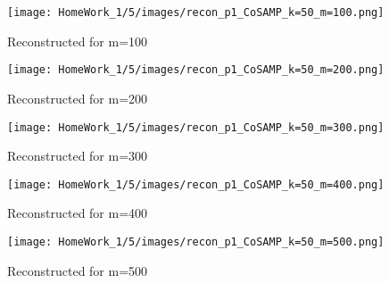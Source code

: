 \documentclass{article}
\begin{document}
\begin{figure}[h!]
    \centering
    \begin{minipage}{0.1\textwidth}
        \texttt{[image: HomeWork\_1/5/images/recon\_p1\_CoSAMP\_k=50\_m=100.png]}
        \caption{Reconstructed for m=100}
    \end{minipage}
    \hspace{0.5cm}
    \begin{minipage}{0.1\textwidth}
        \centering
        \texttt{[image: HomeWork\_1/5/images/recon\_p1\_CoSAMP\_k=50\_m=200.png]}
        \caption{Reconstructed for m=200}
    \end{minipage}
    \hspace{0.5cm}
    \begin{minipage}{0.1\textwidth}
        \centering
        \texttt{[image: HomeWork\_1/5/images/recon\_p1\_CoSAMP\_k=50\_m=300.png]}
        \caption{Reconstructed for m=300}
    \end{minipage}
    \hspace{0.5cm}
    \begin{minipage}{0.1\textwidth}
        \centering
        \texttt{[image: HomeWork\_1/5/images/recon\_p1\_CoSAMP\_k=50\_m=400.png]}
        \caption{Reconstructed for m=400}
    \end{minipage}
    \hspace{0.5cm}
    \begin{minipage}{0.1\textwidth}
        \centering
        \texttt{[image: HomeWork\_1/5/images/recon\_p1\_CoSAMP\_k=50\_m=500.png]}
        \caption{Reconstructed for m=500}
    \end{minipage}

    \vspace{1cm} %


\end{figure}
\end{document}
